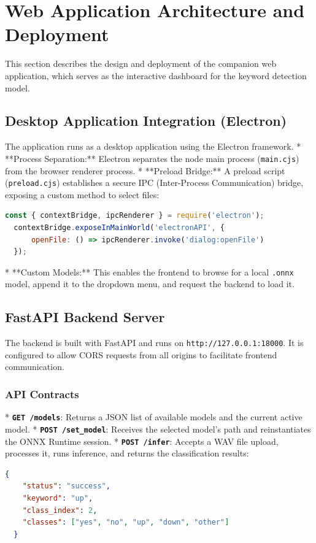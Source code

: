 \section{Web Application Architecture and Deployment}

This section describes the design and deployment of the companion web application, which serves as the interactive dashboard for the keyword detection model.

\subsection{Desktop Application Integration (Electron)}
The application runs as a desktop application using the Electron framework.
* **Process Separation:** Electron separates the node main process (\texttt{main.cjs}) from the browser renderer process.
* **Preload Bridge:** A preload script (\texttt{preload.cjs}) establishes a secure IPC (Inter-Process Communication) bridge, exposing a custom method to select files:
  \begin{lstlisting}[language=JavaScript, caption={IPC File Browser Bridge}]
  const { contextBridge, ipcRenderer } = require('electron');
  contextBridge.exposeInMainWorld('electronAPI', {
      openFile: () => ipcRenderer.invoke('dialog:openFile')
  });
  \end{lstlisting}
* **Custom Models:** This enables the frontend to browse for a local \texttt{.onnx} model, append it to the dropdown menu, and request the backend to load it.

\subsection{FastAPI Backend Server}
The backend is built with FastAPI and runs on \texttt{http://127.0.0.1:18000}. It is configured to allow CORS requests from all origins to facilitate frontend communication.

\subsubsection{API Contracts}
* \textbf{\texttt{GET /models}}: Returns a JSON list of available models and the current active model.
* \textbf{\texttt{POST /set\_model}}: Receives the selected model's path and reinstantiates the ONNX Runtime session.
* \textbf{\texttt{POST /infer}}: Accepts a WAV file upload, processes it, runs inference, and returns the classification results:
  \begin{lstlisting}[language=json, caption={Inference API Response Schema}]
  {
    "status": "success",
    "keyword": "up",
    "class_index": 2,
    "classes": ["yes", "no", "up", "down", "other"]
  }
  \end{lstlisting}

